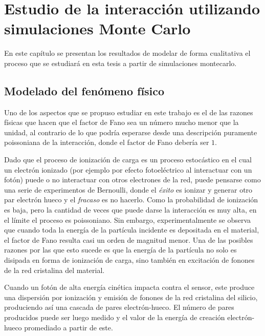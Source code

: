 \chapter{Estudio de la interacción utilizando simulaciones Monte Carlo \label{chap:simulaciones}}
\noindent En este capítulo se presentan los resultados de modelar de forma cualitativa el proceso que se estudiará en esta tesis a partir de simulaciones montecarlo.


\section{Modelado del fenómeno físico}
\noindent Uno de los aspectos que se propuso estudiar en este trabajo es el de las razones físicas que hacen que el factor de Fano sea un número mucho menor que la unidad, al contrario de lo que podría esperarse desde una descripción puramente poissoniana de la interacción, donde el factor de Fano debería ser $1$.

Dado que el proceso de ionización de carga es un proceso estocástico en el cual un electrón ionizado (por ejemplo por efecto fotoeléctrico al interactuar con un fotón) puede o no interactuar con otros electrones de la red, puede pensarse como una serie de experimentos de Bernoulli, donde el \textit{éxito} es ionizar y generar otro par electrón hueco y el \textit{fracaso} es no hacerlo. Como la probabilidad de ionización es baja, pero la cantidad de veces que puede darse la interacción es muy alta, en el límite el proceso es poissoniano. Sin embargo, experimentalmente se observa que cuando toda la energía de la partícula incidente es depositada en el material, el factor de Fano resulta casi un orden de magnitud menor\cite{TesisKevin}. Una de las posibles razones por las que esto sucede es que la energía de la partícula no solo es disipada en forma de ionización de carga, sino también en excitación de fonones de la red cristalina del material.

Cuando un fotón de alta energía cinética impacta contra el sensor, este produce una dispersión por ionización y emisión de fonones de la red cristalina del silicio, produciendo así una cascada de pares electrón-hueco. El número de pares producidos puede ser luego medido y el valor de la energía de creación electrón-hueco promediado a partir de este.

